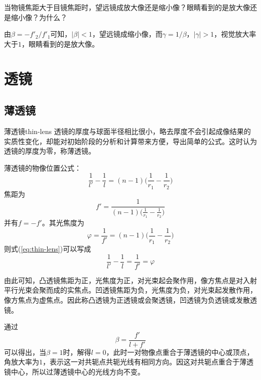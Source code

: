 \documentclass[cn,10pt,chinesefont=founder,math=newtx,cite=super,twoside]{elegantbook}
\begin{document}
\begin{problem}
	当物镜焦距大于目镜焦距时，望远镜成放大像还是缩小像？眼睛看到的是放大像还是缩小像？为什么？
\end{problem}
\begin{solution}
	由$\beta=-f'_2/f'_1$可知，$|\beta|<1$，望远镜成缩小像，而$\gamma=1/\beta$，$|\gamma|>1$，视觉放大率大于$1$，眼睛看到的是放大像。
\end{solution}

\section{透镜}
\subsection{薄透镜}

\begin{definition}{薄透镜}{thin-lens}
	透镜的厚度与球面半径相比很小，略去厚度不会引起成像结果的实质性变化，却能对初始阶段的分析和计算带来方便，导出简单的公式。这时认为透镜的厚度为零，称薄透镜。
\end{definition}

薄透镜的物像位置公式：
\begin{equation}
\frac{1}{l'}-\frac{1}{l}=(n-1)\bigg(\frac{1}{r_1}-\frac{1}{r_2}\bigg)
\label{eq:thin-lens}
\end{equation}
焦距为
\begin{equation}
f'=\frac{1}{(n-1)\big(\frac{1}{r_1}-\frac{1}{r_2}\big)}
\end{equation}
并有$f=-f'$。其光焦度为
\begin{equation}
\varphi=\frac{1}{f'}=(n-1)\bigg(\frac{1}{r_1}-\frac{1}{r_2}\bigg)
\end{equation}
则式(\ref{eq:thin-lens})可以写成
\begin{equation}
\frac{1}{l'}-\frac{1}{l}=\frac{1}{f'}=\varphi
\end{equation}

由此可知，凸透镜焦距为正，光焦度为正，对光束起会聚作用，像方焦点是对入射平行光束会聚而成的实焦点。凹透镜焦距为负，光焦度为负，对光束起发散作用，像方焦点为虚焦点。因此称凸透镜为正透镜或会聚透镜，凹透镜为负透镜或发散透镜。

通过
\begin{equation}
\beta=\frac{f'}{l+f'}
\end{equation}
可以得出，当$\beta=1$时，解得$l=0$，此时一对物像点重合于薄透镜的中心或顶点，角放大率为$1$，表示这一对共轭点共轭光线有相同方向。因这对共轭点重合于薄透镜中心，所以过薄透镜中心的光线方向不变。
\end{document}
